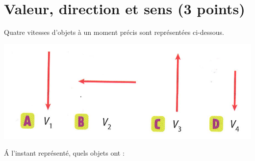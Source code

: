 \section{Valeur, direction et sens (3 points)}

Quatre vitesses d'objets à un moment précis sont représentées ci-dessous.

\includegraphics[scale=0.5]{exemples}

\begin{questions}
	\question \'A l'instant représenté, quels objets ont :

\end{questions}